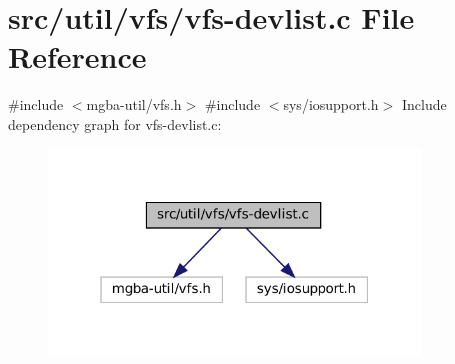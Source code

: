 \hypertarget{vfs-devlist_8c}{}\section{src/util/vfs/vfs-\/devlist.c File Reference}
\label{vfs-devlist_8c}
{\ttfamily \#include $<$mgba-\/util/vfs.\+h$>$}\newline
{\ttfamily \#include $<$sys/iosupport.\+h$>$}\newline
Include dependency graph for vfs-\/devlist.c\+:
\nopagebreak
\begin{figure}[H]
\begin{center}
\leavevmode
\includegraphics[width=280pt]{vfs-devlist_8c__incl}
\end{center}
\end{figure}
